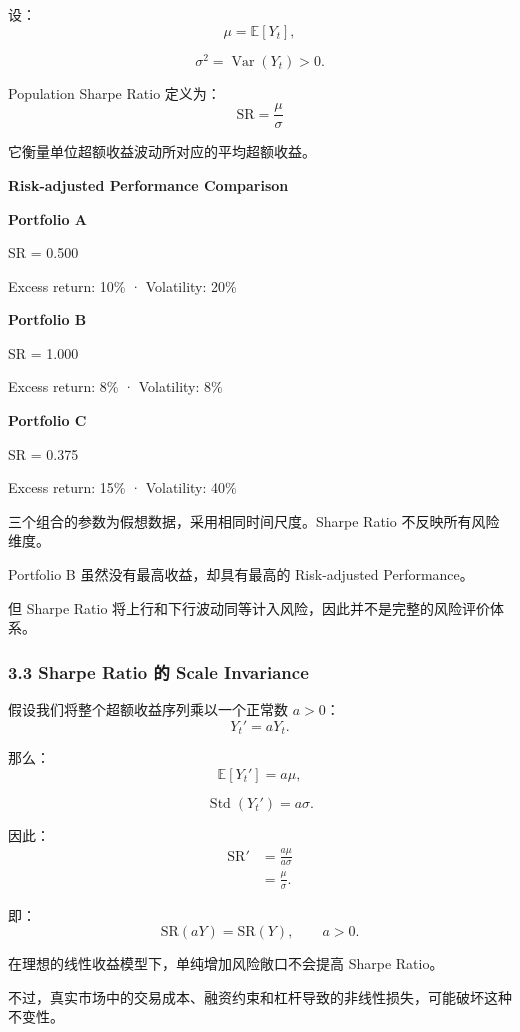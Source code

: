 设：
\[\mu=\mathbb E[Y_t],\]

\[\sigma^2=\operatorname{Var}(Y_t)>0.\]

Population Sharpe Ratio 定义为：
\[\boxed{
\mathrm{SR}
=
\frac{\mu}{\sigma}
}\]

它衡量单位超额收益波动所对应的平均超额收益。

\textbf{Risk-adjusted Performance Comparison}

\textbf{Portfolio A}

SR = 0.500

Excess return: 10\% · Volatility: 20\%

\textbf{Portfolio B}

SR = 1.000

Excess return: 8\% · Volatility: 8\%

\textbf{Portfolio C}

SR = 0.375

Excess return: 15\% · Volatility: 40\%

三个组合的参数为假想数据，采用相同时间尺度。Sharpe Ratio 不反映所有风险维度。

Portfolio B 虽然没有最高收益，却具有最高的 Risk-adjusted Performance。

但 Sharpe Ratio 将上行和下行波动同等计入风险，因此并不是完整的风险评价体系。

\hypertarget{part-4-67-0001-sharpe-ratio-ux7684-scale-invariance}{%
\subsubsection{3.3 Sharpe Ratio 的 Scale Invariance}\label{part-4-67-0001-sharpe-ratio-ux7684-scale-invariance}}

假设我们将整个超额收益序列乘以一个正常数 \(a>0\)：
\[Y_t'=aY_t.\]

那么：
\[\mathbb E[Y_t']=a\mu,\]

\[\operatorname{Std}(Y_t')=a\sigma.\]

因此：
\[\begin{aligned}
\mathrm{SR}'
&=\frac{a\mu}{a\sigma}\\
&=\frac{\mu}{\sigma}.
\end{aligned}\]

即：
\[\boxed{
\mathrm{SR}(aY)=\mathrm{SR}(Y),
\qquad a>0.
}\]

在理想的线性收益模型下，单纯增加风险敞口不会提高 Sharpe Ratio。

不过，真实市场中的交易成本、融资约束和杠杆导致的非线性损失，可能破坏这种不变性。

